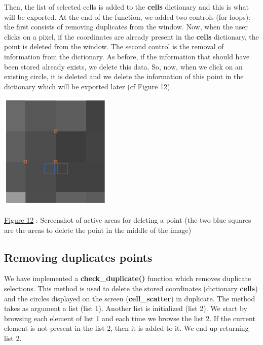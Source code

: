 \documentclass[a4paper,12pt]{report}
\begin{document}
Then, the list of selected cells is added to the \textbf{cells} dictionary and this is what will be exported. At the end of the function, we added two controls (for loops): the first consists of removing duplicates from the window. Now, when the user clicks on a pixel, if the coordinates are already present in the \textbf{cells} dictionary, the point is deleted from the window. The second control is the removal of information from the dictionary. As before, if the information that should have been stored already exists, we delete this data. So, now, when we click on an existing circle, it is deleted and we delete the information of this point in the dictionary which will be exported later (cf Figure 12).
\begin{center} \includegraphics[scale=0.52]{deletePoints.png}

\underline{Figure 12} : Screenshot of active areas for deleting a point (the two blue squares are the areas to delete the point in the middle of the image) \vspace{1\baselineskip}\\ \end{center}


\subsection{Removing duplicates points}
We have implemented a \textbf{check\_duplicate()} function which removes duplicate selections. This method is used to delete the stored coordinates (dictionary \textbf{cells}) and the circles displayed on the screen (\textbf{cell\_scatter}) in duplicate. The method takes as argument a list (list 1). Another list is initialized (list 2). We start by browsing each element of list 1 and each time we browse the list 2. If the current element is not present in the list 2, then it is added to it. We end up returning list 2.\\
\end{document}

